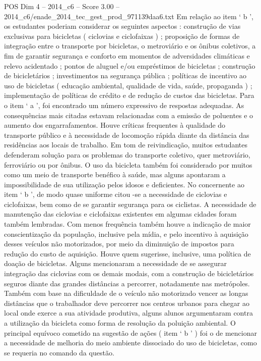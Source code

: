 \begin{textsample}{POS Dim 4 – 2014\_c6 – Score 3.00 – 2014\_c6/enade\_2014\_tec\_gest\_prod\_971139daa6.txt}
Em relação ao item ‘ b ’, os estudantes poderiam considerar os seguintes aspectos : construção de vias exclusivas para bicicletas ( ciclovias e ciclofaixas ) ; proposição de formas de integração entre o transporte por bicicletas, o metroviário e os ônibus coletivos, a fim de garantir segurança e conforto em momentos de adversidades climáticas e relevo acidentado ; pontos de aluguel e/ou empréstimos de bicicletas ; construção de bicicletários ; investimentos na segurança pública ; políticas de incentivo ao uso de bicicletas ( educação ambiental, qualidade de vida, saúde, propaganda ) ; implementação de políticas de crédito e de redução de custos das bicicletas.
Para o item ‘ a ’, foi encontrado um número expressivo de respostas adequadas.
As consequências mais citadas estavam relacionadas com a emissão de poluentes e o aumento dos engarrafamentos.
Houve críticas frequentes à qualidade do transporte público e à necessidade de locomoção rápida diante da distância das residências aos locais de trabalho.
Em tom de reivindicação, muitos estudantes defenderam solução para os problemas do transporte coletivo, quer metroviário, ferroviário ou por ônibus.
O uso da bicicleta também foi considerado por muitos como um meio de transporte benéfico à saúde, mas alguns apontaram a impossibilidade de sua utilização pelos idosos e deficientes.
No concernente ao item ‘ b ’, de modo quase uniforme citou -se a necessidade de ciclovias e ciclofaixas, bem como de se garantir segurança para os ciclistas.
A necessidade de manutenção das ciclovias e ciclofaixas existentes em algumas cidades foram também lembradas.
Com menos frequência também houve a indicação de maior conscientização da população, inclusive pela mídia, e pelo incentivo à aquisição desses veículos não motorizados, por meio da diminuição de impostos para redução do custo de aquisição.
Houve quem sugerisse, inclusive, uma política de doação de bicicletas.
Alguns mencionaram a necessidade de se assegurar integração das ciclovias com os demais modais, com a construção de bicicletários seguros diante das grandes distâncias a percorrer, notadamente nas metrópoles.
Também com base na dificuldade de o veículo não motorizado vencer as longas distâncias que o trabalhador deve percorrer nos centros urbanos para chegar ao local onde exerce a sua atividade produtiva, alguns alunos argumentaram contra a utilização da bicicleta como forma de resolução da poluição ambiental.
O principal equívoco cometido na sugestão de ações ( item ‘ b ’ ) foi o de mencionar a necessidade de melhoria do meio ambiente dissociado do uso de bicicletas, como se requeria no comando da questão.

\end{textsample}
